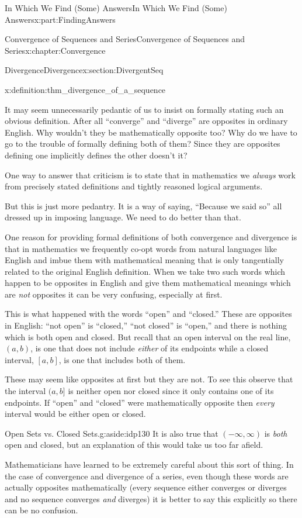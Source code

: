 \documentclass[oneside,10pt,]{book}
\numberwithin{equation}{section}
\begin{document}
\begin{partptx}{In Which We Find (Some) Answers}{}{In Which We Find (Some) Answers}{}{}{x:part:FindingAnswers}
\begin{chapterptx}{Convergence of Sequences and Series}{}{Convergence of Sequences and Series}{}{}{x:chapter:Convergence}
\begin{sectionptx}{Divergence}{}{Divergence}{}{}{x:section:DivergentSeq}
\begin{definition}{}{x:definition:thm_divergence_of_a_sequence}
\end{definition}
It may seem unnecessarily pedantic of us to insist on formally stating such an obvious definition. After all ``converge'' and ``diverge'' are opposites in ordinary English. Why wouldn't they be mathematically opposite too? Why do we have to go to the trouble of formally defining both of them? Since they are opposites defining one implicitly defines the other doesn't it?%
\par
One way to answer that criticism is to state that in mathematics we \emph{always} work from precisely stated definitions and tightly reasoned logical arguments.%
\par
But this is just more pedantry. It is a way of saying, ``Because we said so'' all dressed up in imposing language. We need to do better than that.%
\par
One reason for providing formal definitions of both convergence and divergence is that in mathematics we frequently co-opt words from natural languages like English and imbue them with mathematical meaning that is only tangentially related to the original English definition. When we take two such words which happen to be opposites in English and give them mathematical meanings which are \emph{not} opposites it can be very confusing, especially at first.%
\par
This is what happened with the words ``open'' and ``closed.'' These are opposites in English: ``not open'' is ``closed,'' ``not closed'' is ``open,'' and there is nothing which is both open and closed. But recall that an open interval on the real line, \((a,b)\), is one that does not include \emph{either} of its endpoints while a closed interval, \([a,b]\), is one that includes both of them.%
\par
These may seem like opposites at first but they are not.  To see this observe that the interval \((a,b]\) is neither open nor closed since it only contains one of its endpoints. If ``open'' and ``closed'' were mathematically opposite then \emph{every} interval would be either open or closed.%
\begin{aside}{Open Sets vs. Closed Sets.}{g:aside:idp130}%
It is also true that \((-\infty,\infty)\) is \emph{both} open and closed, but an explanation of this would take us too far afield.%
\end{aside}
Mathematicians have learned to be extremely careful about this sort of thing. In the case of convergence and divergence of a series, even though these words are actually opposites mathematically (every sequence either converges or diverges and no sequence converges \emph{and} diverges) it is better to say this explicitly so there can be no confusion.%

\end{sectionptx}
\end{chapterptx}
\end{partptx}
\end{document}
